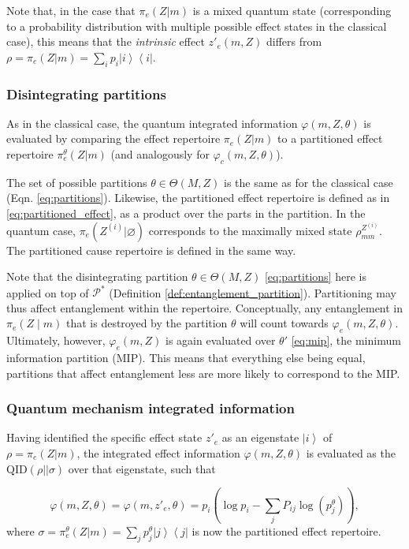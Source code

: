 \documentclass[preprints, article, accept, pdftex, moreauthors, letterpaper]{Definitions/mdpi}
\newcommand{\ket}[1]{\left| #1 \right>} %
\newcommand{\bra}[1]{\left< #1 \right|} %
\renewcommand{\=}[1]{\stackrel{#1}{=}} %
\newcommand{\QID}{\text{QID}}
\newcommand{\p}{\theta} %
\newcommand{\Part}{\Theta}
\newcommand{\rmm}{\rho_{mm}}
\renewcommand{\*}{\otimes}%
\begin{document}
Note that, in the case that $\pi_e(Z|m)$ is a mixed quantum state (corresponding to a probability distribution with multiple possible effect states in the classical case), this means that the \textit{intrinsic} effect $z'_e(m,Z)$ differs from $\rho = \pi_e(Z|m) = \sum_i p_i \ket{i}\bra{i}$.

\subsubsection{Disintegrating partitions}

As in the classical case, the quantum integrated information $\varphi(m,Z,\theta)$ is evaluated by comparing the effect repertoire $\pi_e(Z|m)$ to a partitioned effect repertoire $\pi^\theta_e(Z|m)$ (and analogously for $\varphi_c(m, Z, \theta)$).

The set of possible partitions $\p \in \Part(M,Z)$ is the same as for the classical case (Eqn. \ref{eq:partitions}). Likewise, the partitioned effect repertoire is defined as in \eqref{eq:partitioned_effect}, as a product over the parts in the partition. 
In the quantum case, $\pi_e(Z^{(i)}|\varnothing)$ corresponds to the maximally mixed state $\rmm^{Z^{(i)}}$. 
The partitioned cause repertoire is defined in the same way.

Note that the disintegrating partition $\theta \in \Theta(M,Z)$ \eqref{eq:partitions} here is applied on top of $\mathcal{P}^*$ (Definition \ref{def:entanglement_partition}). Partitioning may thus affect entanglement within the repertoire. 
Conceptually, any entanglement in $\pi_e(Z\mid m)$ that is destroyed by the partition $\p$ will count towards $\varphi_e(m, Z, \p)$. Ultimately, however, $\varphi_e(m, Z)$ is again evaluated over $\p'$ \eqref{eq:mip}, the minimum information partition (MIP). This means that everything else being equal, partitions that affect entanglement less are more likely to correspond to the MIP.

\subsubsection{Quantum mechanism integrated information}

Having identified the specific effect state $z'_e$ as an eigenstate $\ket{i}$ of $\rho = \pi_e(Z|m)$, the integrated effect information $\varphi(m, Z, \theta)$ is evaluated as the $\QID(\rho||\sigma)$ over that eigenstate, such that

\begin{equation}
\label{eq:qphi}
    \varphi(m,Z,\theta) = \varphi(m, z'_e, \theta) = p_i \left( \log p_i - \sum_j P_{ij} \log (p^\theta_j) \right),
\end{equation}
%
where $\sigma = \pi^\theta_e(Z|m) = \sum_j p^\theta_j \ket{j}\bra{j}$ is now the partitioned effect repertoire.
\end{document}
